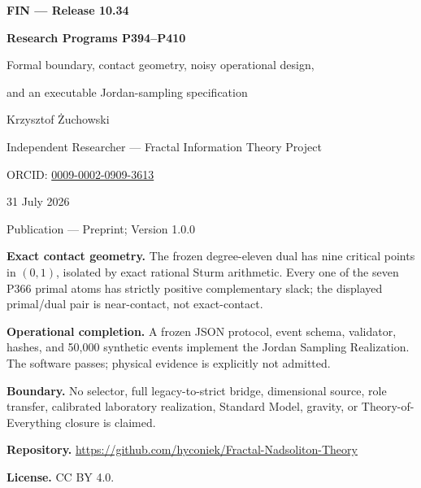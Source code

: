 \documentclass[11pt,a4paper,openany]{report}
\begin{document}
\hypersetup{pageanchor=false}
\begin{titlepage}
\centering
\vspace*{8mm}
{\Large\bfseries FIN --- Release 10.34\par}
\vspace{9mm}
{\Huge\bfseries Research Programs P394--P410\par}
\vspace{6mm}
{\Large Formal boundary, contact geometry, noisy operational design,\par
and an executable Jordan-sampling specification\par}
\vspace{14mm}
{\Large Krzysztof \.{Z}uchowski\par}
\vspace{2mm}
{\normalsize Independent Researcher --- Fractal Information Theory Project\par}
\vspace{2mm}
{\normalsize ORCID: \href{https://orcid.org/0009-0002-0909-3613}{0009-0002-0909-3613}\par}
\vspace{7mm}
{\large 31 July 2026\par}
{\normalsize Publication --- Preprint; Version 1.0.0\par}
\vfill
\begin{minipage}{0.93\textwidth}
\small
\textbf{Exact contact geometry.} The frozen degree-eleven dual has nine
critical points in $(0,1)$, isolated by exact rational Sturm arithmetic.
Every one of the seven P366 primal atoms has strictly positive complementary
slack; the displayed primal/dual pair is near-contact, not exact-contact.

\textbf{Operational completion.} A frozen JSON protocol, event schema,
validator, hashes, and 50,000 synthetic events implement the Jordan Sampling
Realization. The software passes; physical evidence is explicitly not
admitted.

\textbf{Boundary.} No selector, full legacy-to-strict bridge, dimensional
source, role transfer, calibrated laboratory realization, Standard Model,
gravity, or Theory-of-Everything closure is claimed.

\medskip
\textbf{Repository.} \url{https://github.com/hyconiek/Fractal-Nadsoliton-Theory}

\textbf{License.} CC BY 4.0.
\end{minipage}
\vfill
\end{titlepage}
\hypersetup{pageanchor=true}
\end{document}
